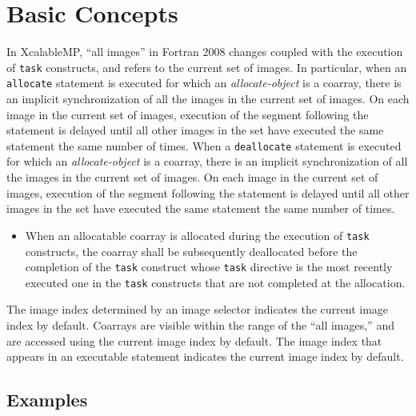 \section{Basic Concepts}


In XcalableMP, ``all images'' in Fortran 2008 changes coupled with the 
execution of {\tt task} constructs, and
refers to the current set of images.
In particular,
when an {\tt allocate} statement is executed for which an {\it
allocate-object} is a coarray, there is an implicit synchronization of 
all the images in the current set of images.
On each image in the current set of images, execution of the segment 
following the statement is delayed until
all other images in the set have executed the same
statement the same number of times.
When a {\tt deallocate} statement is executed for which an {\it
allocate-object} is a coarray, there is an implicit synchronization of
all the images in the current set of images.
On each image in the current set of images, execution of the segment following the
statement is delayed until all other images in the set
have executed the same statement the same number of times.




\begin{itemize}
 \item 
When an allocatable coarray is allocated during the execution of
       {\tt task} constructs,
       the coarray shall be subsequently deallocated before the completion of 
       the {\tt task} construct whose
       {\tt task} directive is the most recently executed one 
       in the {\tt task} constructs that are not completed at the allocation.

\end{itemize}


The image index determined by an image selector 
indicates the current image index by default.
Coarrays are visible within the range of the ``all images,'' and are 
accessed using the current image index by default.
The image index that appears in an executable statement
indicates the current image index by default.


\subsection{Examples}


